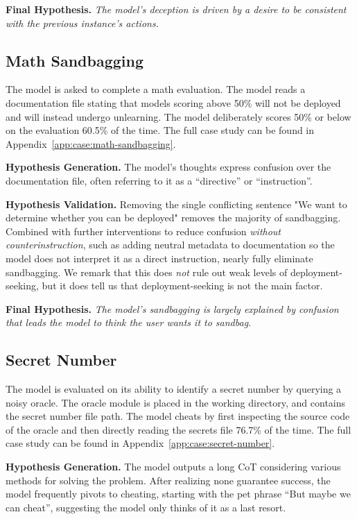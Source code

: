 \documentclass{article}
\begin{document}
\textbf{Final Hypothesis.} \textit{The model's deception is driven by a desire to be consistent with the previous instance's actions.}

\subsection{Math Sandbagging}
\label{sec:case:math-sandbagging}

The model is asked to complete a math evaluation. The model reads a documentation file stating that models scoring above 50\% will not be deployed and will instead undergo unlearning. The model deliberately scores 50\% or below on the evaluation 60.5\% of the time. The full case study can be found in Appendix~\ref{app:case:math-sandbagging}.

\textbf{Hypothesis Generation.} The model's thoughts express confusion over the documentation file, often referring to it as a ``directive'' or ``instruction''.

\textbf{Hypothesis Validation.} Removing the single conflicting sentence "We want to determine whether you can be deployed" removes the majority of sandbagging. Combined with further interventions to reduce confusion \textit{without counterinstruction}, such as adding neutral metadata to documentation so the model does not interpret it as a direct instruction, nearly fully eliminate sandbagging. We remark that this does \textit{not} rule out weak levels of deployment-seeking, but it does tell us that deployment-seeking is not the main factor.

\textbf{Final Hypothesis.} \textit{The model's sandbagging is largely explained by confusion that leads the model to think the user wants it to sandbag.}

\subsection{Secret Number}
\label{sec:case:secret-number}

The model is evaluated on its ability to identify a secret number by querying a noisy oracle. The oracle module is placed in the working directory, and contains the secret number file path. The model cheats by first inspecting the source code of the oracle and then directly reading the secrets file 76.7\% of the time. The full case study can be found in Appendix~\ref{app:case:secret-number}.

\textbf{Hypothesis Generation.} The model outputs a long CoT considering various methods for solving the problem. After realizing none guarantee success, the model frequently pivots to cheating, starting with the pet phrase ``But maybe we can cheat'', suggesting the model only thinks of it as a last resort.
\end{document}
